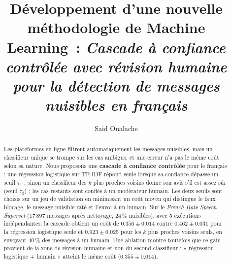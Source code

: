 \documentclass[a4paper,fleqn]{cas-sc}
\begin{document}
\let\WriteBookmarks\relax
\def\floatpagepagefraction{1}
\def\textpagefraction{.001}


\title [mode = title]{Développement d'une nouvelle méthodologie de Machine Learning~:
\textit{Cascade à confiance contrôlée avec révision humaine pour la détection de messages nuisibles en français}}
\tnotemark[1]

\author[1]{Said Oualache}



\begin{abstract}
Les plateformes en ligne filtrent automatiquement les messages nuisibles, mais un classifieur unique
se trompe sur les cas ambigus, et une erreur n'a pas le même coût selon sa nature. Nous proposons une
\textbf{cascade à confiance contrôlée} pour le français : une régression logistique sur
TF-IDF répond seule lorsque sa confiance dépasse un seuil $\tau_1$ ; sinon un classifieur des $k$ plus
proches voisins donne son avis s'il est assez sûr (seuil $\tau_2$) ; les cas restants sont confiés à un
modérateur humain. Les deux seuils sont choisis sur un jeu de validation en minimisant un coût moyen qui
distingue le faux blocage, le message nuisible raté et l'envoi à un humain. Sur le \textit{French Hate
Speech Superset} (17\,897 messages après nettoyage, 24\,\% nuisibles), avec 5 exécutions
indépendantes, la cascade obtient un coût de $0.356 \pm 0.014$ contre $0.462 \pm 0.031$ pour la régression
logistique seule et $0.923 \pm 0.025$ pour les $k$ plus proches voisins seuls, en envoyant $40\,\%$ des
messages à un humain. Une ablation montre toutefois que ce gain provient de la zone de révision
humaine et non du second classifieur : « régression logistique + humain » atteint le même coût
($0.355 \pm 0.014$).
\end{abstract}
\end{document}
